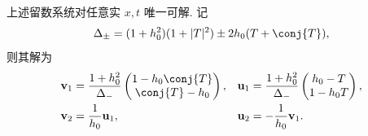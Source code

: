 \begin{lemma}[一轨道系统的消元]\label{lem:direct-solve}
上述留数系统对任意实 $x,t$ 唯一可解. 记
\begin{equation}\label{eq:delta-pair}
\Delta_\pm=(1+h_0^2)(1+|T|^2)\pm2h_0(T+\conj{T}),
\end{equation}
则其解为
\begin{align}
\mathbf v_1&=\dfrac{1+h_0^2}{\Delta_-}
\begin{pmatrix}1-h_0\conj{T}\\\conj{T}-h_0\end{pmatrix},&
\mathbf u_1&=\dfrac{1+h_0^2}{\Delta_-}
\begin{pmatrix}h_0-T\\1-h_0T\end{pmatrix},\label{eq:direct-vu1}\\
\mathbf v_2&=\dfrac{1}{h_0}\mathbf u_1,&
\mathbf u_2&=-\dfrac{1}{h_0}\mathbf v_1.\label{eq:direct-vu2}
\end{align}
\end{lemma}
